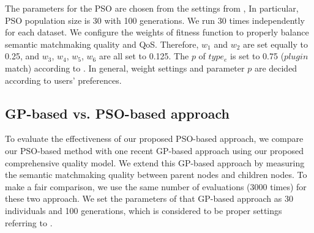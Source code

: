 The parameters for the PSO are chosen from the settings from \cite{shi2001particle}, In particular, PSO population size is 30 with 100 generations. We run 30 times independently for each dataset. We configure the weights of fitness function to properly balance semantic matchmaking quality and QoS. Therefore, $w_{1}$ and $w_{2}$ are set equally to 0.25, and $w_{3}$, $w_{4}$, $w_{5}$, $w_{6}$ are all set to 0.125. The $p$ of $type_e$ is set to 0.75 ($plugin$ match) according to \cite{lecue2009optimizing}. In general, weight settings and parameter $p$ are decided according to users' preferences.

\subsection{GP-based vs. PSO-based approach}\label{comparisonTestWithGP}
To evaluate the effectiveness of our proposed PSO-based approach, we compare our PSO-based method with one recent GP-based approach \cite{ma2015hybrid} using our proposed comprehensive quality model. We extend this GP-based approach by measuring the semantic matchmaking quality between parent nodes and children nodes. To make a fair comparison, we use the same number of evaluations (3000 times) for these two approach. We set the parameters of that GP-based approach as 30 individuals and 100 generations, which is considered to be proper settings referring to \cite{da2015gp}.


